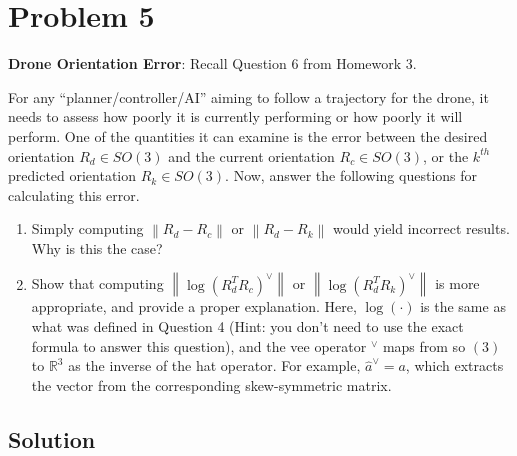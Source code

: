 \section*{Problem 5}

\textbf{Drone Orientation Error}:
Recall Question 6 from Homework 3.

For any ``planner/controller/AI'' aiming to follow a trajectory for the drone, it needs to assess how poorly it is currently performing or how poorly it will perform.
One of the quantities it can examine is the error between the desired orientation \( R_{d} \in SO(3) \) and the current orientation \( R_{c} \in SO(3) \), or the \( k^{th} \) predicted orientation \( R_{k} \in SO(3) \).
Now, answer the following questions for calculating this error.
\begin{enumerate}[label= (\alph*)]
      \item Simply computing \( \left \| R_{d}-R_{c}\right \| \) or \( \left \| R_{d}-R_{k}\right \| \) would yield incorrect results.
            Why is this the case?
      \item  Show that computing \( \left \| \log {\left(R_{d}^{T} R_{c}\right)}^{\vee}\right \| \) or \( \left \| \log {\left(R_{d}^{T} R_{k}\right)}^{\vee}\right \| \) is more appropriate, and provide a proper explanation.
            Here, \( \log (\cdot) \) is the same as what was defined in Question 4 (Hint: you don't need to use the exact formula to answer this question), and the vee operator \( { }^{\vee} \) maps from so \( (3) \) to \( \mathbb{R}^{3} \) as the inverse of the hat operator.
            For example, \( \hat{a}^{\vee}=a \), which extracts the vector from the corresponding skew-symmetric matrix.
\end{enumerate}

\subsection*{Solution}
